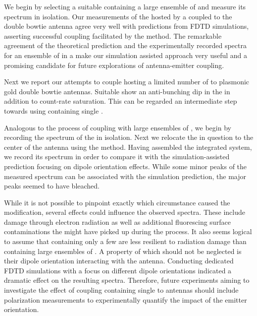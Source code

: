    We begin by selecting a suitable \nd containing a large ensemble of \sivs and measure its spectrum in isolation. Our measurements of the \sivs hosted by a \nd coupled to the double bowtie antenna agree very well with predictions from FDTD simulations, asserting successful coupling facilitated by the \pp method. The remarkable agreement of the theoretical prediction and the experimentally recorded spectra for an ensemble of \sivs in a \nd make our simulation assisted approach very useful and a promising candidate for future explorations of antenna-emitter coupling.


   Next we report our attempts to couple \nds hosting a limited number of \sivs to plasmonic gold double bowtie antennas. Suitable \nds show an anti-bunching dip in the \gtf in addition to count-rate saturation. This can be regarded an intermediate step towards using \nds containing single \sivs.

   Analogous to the process of coupling \nds with large ensembles of \sivs, we begin by recording the spectrum of the \nd in isolation. Next we relocate the \nd in question to the center of the antenna using the \pp method. Having assembled the integrated system, we record its spectrum in order to compare it with the simulation-assisted prediction focusing on dipole orientation effects. While some minor peaks of the measured spectrum can be associated with the simulation prediction, the major peaks seemed to have bleached.

While it is not possible to pinpoint exactly which circumstance caused the modification, several effects could influence the observed spectra. These include damage through electron radiation as well as additional fluorescing surface contaminations the \nd might have picked up during the \pp process. It also seems logical to assume that \nds containing only a few \sivs are less resilient to radiation damage than \nds containing large ensembles of \sivs.
   A property of \sivs which should not be neglected is their dipole orientation interacting with the antenna. Conducting dedicated FDTD simulations with a focus on different dipole orientations indicated a dramatic effect on the resulting spectra. Therefore, future experiments aiming to investigate the effect of coupling \nds containing single \sivs to antennas should include polarization measurements to experimentally quantify the impact of the emitter orientation. 

